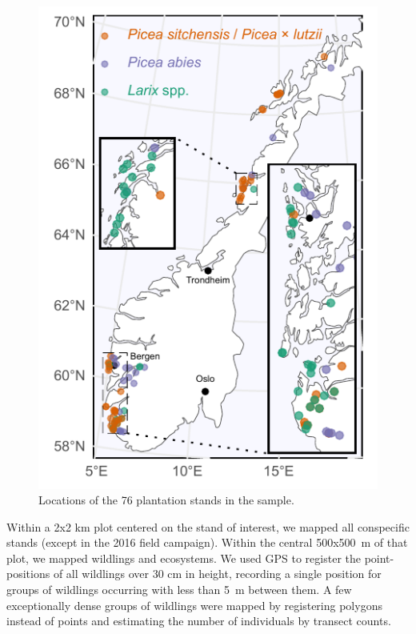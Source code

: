 \documentclass[
]{article}
\begin{document}
\begin{figure}
\includegraphics[width=1\linewidth]{figures/sites-map} \caption{Locations of the 76 plantation stands in the sample.}\label{fig:sites-map}
\end{figure}

Within a 2x2 km plot centered on the stand of interest, we mapped all
conspecific stands (except in the 2016 field campaign). Within the central
500x500~m of that plot, we mapped wildlings and ecosystems. We used GPS to
register the point-positions of all wildlings over 30 cm in height, recording a
single position for groups of wildlings occurring with less than 5~m between
them. A few exceptionally dense groups of wildlings were mapped by registering
polygons instead of points and estimating the number of individuals by transect
counts.
\end{document}
